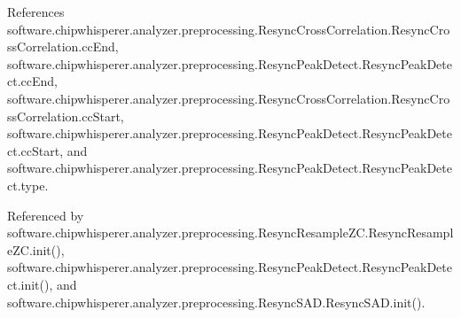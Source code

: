 References software.\+chipwhisperer.\+analyzer.\+preprocessing.\+Resync\+Cross\+Correlation.\+Resync\+Cross\+Correlation.\+cc\+End, software.\+chipwhisperer.\+analyzer.\+preprocessing.\+Resync\+Peak\+Detect.\+Resync\+Peak\+Detect.\+cc\+End, software.\+chipwhisperer.\+analyzer.\+preprocessing.\+Resync\+Cross\+Correlation.\+Resync\+Cross\+Correlation.\+cc\+Start, software.\+chipwhisperer.\+analyzer.\+preprocessing.\+Resync\+Peak\+Detect.\+Resync\+Peak\+Detect.\+cc\+Start, and software.\+chipwhisperer.\+analyzer.\+preprocessing.\+Resync\+Peak\+Detect.\+Resync\+Peak\+Detect.\+type.



Referenced by software.\+chipwhisperer.\+analyzer.\+preprocessing.\+Resync\+Resample\+Z\+C.\+Resync\+Resample\+Z\+C.\+init(), software.\+chipwhisperer.\+analyzer.\+preprocessing.\+Resync\+Peak\+Detect.\+Resync\+Peak\+Detect.\+init(), and software.\+chipwhisperer.\+analyzer.\+preprocessing.\+Resync\+S\+A\+D.\+Resync\+S\+A\+D.\+init().



